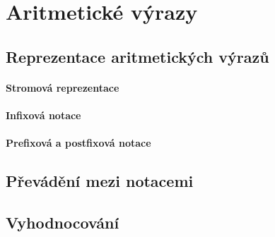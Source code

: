 \ifx\ucebnice\undefined

\fi
\section{Aritmetické výrazy}
\begin{todo}
\subsection{Reprezentace aritmetických výrazů}
\paragraph{Stromová reprezentace}
\paragraph{Infixová notace}
\paragraph{Prefixová a postfixová notace}
\subsection{Převádění mezi notacemi}
\subsection{Vyhodnocování}
\end{todo}
\ifx\ucebnice\undefined

\fi
